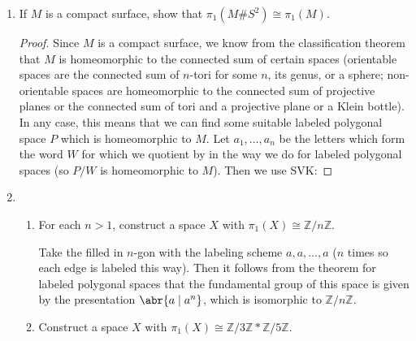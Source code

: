 \documentclass[11pt]{article}
\begin{document}
\begin{enumerate}
\begin{enumerate}
\begin{proof}
            Suppose that $g$ is continuous. We show that preimages of open sets in $Z$ under $f$ are open in $Y$. Since $g$ is continuous, for any open set $U$ of $Z$, the set $g^{-1}(U)$ is open in $X$. But $g^{-1}(U) = (p^{-1}\circ f^{-1})(U) = p^{-1}(f^{-1}(U))$, and since this set is open by the definition of the quotient topology, we must have that $f^{-1}(U)$ is open in $Y$. This means that the preimage of $U$ under $f$ is open in $Y$. Since $U$ was arbitrary, it follows that $f$ is continuous.
        \end{proof}
    \end{enumerate}
    \item If $M$ is a compact surface, show that $\pi_1(M\#S^2)\cong \pi_1(M)$.\begin{proof}
        Since $M$ is a compact surface, we know from the classification theorem that $M$ is homeomorphic to the connected sum of certain spaces (orientable spaces are the connected sum of $n$-tori for some $n$, its genus, or a sphere; non-orientable spaces are homeomorphic to the connected sum of projective planes or the connected sum of tori and a projective plane or a Klein bottle). In any case, this means that we can find some suitable labeled polygonal space $P$ which is homeomorphic to $M$. Let $a_1,\dots,a_n$ be the letters which form the word $W$ for which we quotient by in the way we do for labeled polygonal spaces (so $P/W$ is homeomorphic to $M$). Then we use SVK:\vspace*{30em} 
    \end{proof}
    \item \begin{enumerate}
        \item For each $n>1$, construct a space $X$ with $\pi_1(X)\cong \mathbb{Z}/n\mathbb{Z}$.
        
        Take the filled in $n$-gon with the labeling scheme $a,a,\dots,a$ ($n$ times so each edge is labeled this way). Then it follows from the theorem for labeled polygonal spaces that the fundamental group of this space is given by the presentation $\abr{a\mid a^n}$, which is isomorphic to $\mathbb{Z}/n\mathbb{Z}$.
        \item Construct a space $X$ with $\pi_1(X)\cong \mathbb{Z}/3\mathbb{Z}\ast \mathbb{Z}/5\mathbb{Z}$.
        

\end{enumerate}
\end{enumerate}
\end{document}
